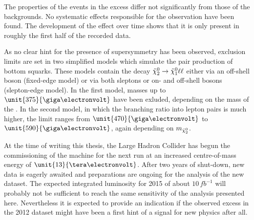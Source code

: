 The properties of the events in the excess differ not significantly from those of the backgrounds. No systematic effects responsible for the observation have been found. The development of the effect over time shows that it is only present in roughly the first half of the recorded data. 

As no clear hint for the presence of supersymmetry has been observed, exclusion limits are set in two simplified models which simulate the pair production of bottom squarks. These models contain the decay ${\tilde{\chi}^0_2} \rightarrow {\tilde{\chi}^0_1} \ell\ell$ either via an off-shell \Z boson (fixed-edge model) or via both sleptons or on- and off-shell \Z bosons (slepton-edge model). In the first model, \sbottom masses up to $\unit{375}{\giga\electronvolt}$ have been exluded, depending on the mass of the \secondchi. In the second model, in which the branching ratio into lepton pairs is much higher, the limit ranges from $\unit{470}{\giga\electronvolt}$ to $\unit{590}{\giga\electronvolt}$, again depending on $m_{{\tilde{\chi}^0_2}}$. 

At the time of writing this thesis, the Large Hadron Collider has begun the commissioning of the machine for the next run at  an increased centre-of-mass energy of $\unit{13}{\tera\electronvolt}$. After two years of shut-down, new data is eagerly awaited and preparations are ongoing for the analysis of the new dataset. The expected integrated luminosity for 2015 of about $10\,fb^{-1}$ will probably not be sufficient to reach the same sensitivity of the analysis presented here. Nevertheless it is expected to provide an indication if the observed excess in the 2012 dataset might have been a first hint of a signal for new physics after all. 